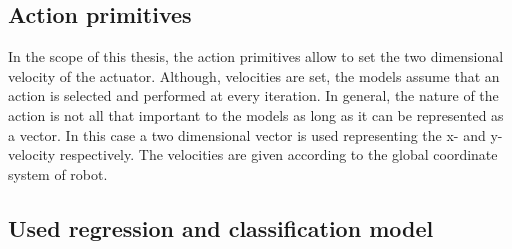 %

\subsection{Action primitives}
In the scope of this thesis, the action primitives allow to set the two dimensional velocity of the actuator. Although, velocities are set, the models assume that an action is selected and performed at every iteration. In general, the nature of the action is not all that important to the models as long as it can be represented as a vector. In this case a two dimensional vector is used representing the x- and y-velocity respectively. The velocities are given according to the global coordinate system of robot. 


\subsection{Used regression and classification model}

